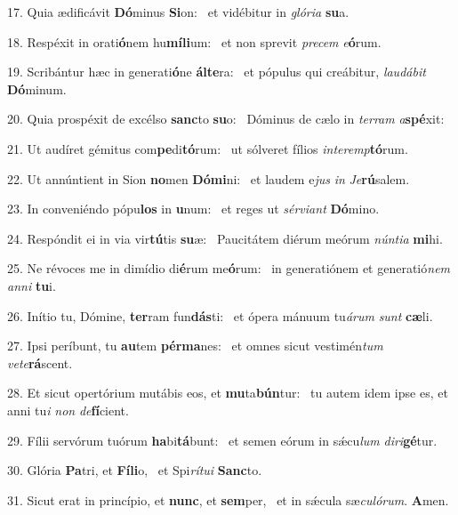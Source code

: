 17. Quia ædificávit \textbf{Dó}minus \textbf{Si}on: \ast\  et vidébitur in \textit{gló}\textit{ri}\textit{a} \textbf{su}a.\

18. Respéxit in orati\textbf{ó}nem hu\textbf{mí}\textbf{li}um: \ast\  et non sprevit \textit{pre}\textit{cem} \textit{e}\textbf{ó}rum.\

19. Scribántur hæc in generati\textbf{ó}ne \textbf{ál}\textbf{te}ra: \ast\  et pópulus qui creábitur, \textit{lau}\textit{dá}\textit{bit} \textbf{Dó}minum.\

20. Quia prospéxit de excélso \textbf{sanc}to \textbf{su}o: \ast\  Dóminus de cælo in \textit{ter}\textit{ram} \textit{a}\textbf{spé}xit:\

21. Ut audíret gémitus com\textbf{pe}di\textbf{tó}rum: \ast\  ut sólveret fílios \textit{in}\textit{ter}\textit{emp}\textbf{tó}rum.\

22. Ut annúntient in Sion \textbf{no}men \textbf{Dó}\textbf{mi}ni: \ast\  et laudem e\textit{jus} \textit{in} \textit{Je}\textbf{rú}salem.\

23. In conveniéndo pópu\textbf{los} in \textbf{u}num: \ast\  et reges ut \textit{sér}\textit{vi}\textit{ant} \textbf{Dó}mino.\

24. Respóndit ei in via vir\textbf{tú}tis \textbf{su}æ: \ast\  Paucitátem diérum meórum \textit{nún}\textit{ti}\textit{a} \textbf{mi}hi.\

25. Ne révoces me in dimídio di\textbf{é}rum me\textbf{ó}rum: \ast\  in generatiónem et generatió\textit{nem} \textit{an}\textit{ni} \textbf{tu}i.\

26. Inítio tu, Dómine, \textbf{ter}ram fun\textbf{dás}ti: \ast\  et ópera mánuum tu\textit{á}\textit{rum} \textit{sunt} \textbf{cæ}li.\

27. Ipsi períbunt, tu \textbf{au}tem \textbf{pér}\textbf{ma}nes: \ast\  et omnes sicut vestimén\textit{tum} \textit{ve}\textit{te}\textbf{rá}scent.\

28. Et sicut opertórium mutábis eos, et \textbf{mu}ta\textbf{bún}tur: \ast\  tu autem idem ipse es, et anni tu\textit{i} \textit{non} \textit{de}\textbf{fí}cient.\

29. Fílii servórum tuórum \textbf{ha}bi\textbf{tá}bunt: \ast\  et semen eórum in sǽcu\textit{lum} \textit{di}\textit{ri}\textbf{gé}tur.\

30. Glória \textbf{Pa}tri, et \textbf{Fí}\textbf{li}o, \ast\  et Spi\textit{rí}\textit{tu}\textit{i} \textbf{Sanc}to.\

31. Sicut erat in princípio, et \textbf{nunc}, et \textbf{sem}per, \ast\  et in sǽcula sæ\textit{cu}\textit{ló}\textit{rum}. \textbf{A}men.\

